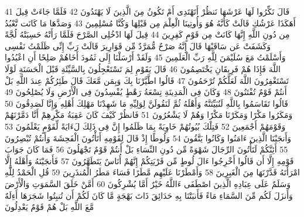 \documentclass[20pt,a4paper]{article}
\begin{document}
{\tiny\colorbox{cl_aya}{41}} قَالَ نَكِّرُوا لَهَا عَرْشَهَا نَنظُرْ أَتَهْتَدِى أَمْ تَكُونُ مِنَ الَّذِينَ لَا يَهْتَدُونَ
{\tiny\colorbox{cl_aya}{42}} فَلَمَّا جَاءَتْ قِيلَ أَهَكَذَا عَرْشُكِ قَالَتْ كَأَنَّهُ هُوَ وَأُوتِينَا الْعِلْمَ مِن قَبْلِهَا وَكُنَّا مُسْلِمِينَ
{\tiny\colorbox{cl_aya}{43}} وَصَدَّهَا مَا كَانَت تَّعْبُدُ مِن دُونِ اللَّهِ إِنَّهَا كَانَتْ مِن قَوْمٍ كَفِرِينَ
{\tiny\colorbox{cl_aya}{44}} قِيلَ لَهَا ادْخُلِى الصَّرْحَ فَلَمَّا رَأَتْهُ حَسِبَتْهُ لُجَّةً وَكَشَفَتْ عَن سَاقَيْهَا قَالَ إِنَّهُ صَرْحٌ مُّمَرَّدٌ مِّن قَوَارِيرَ قَالَتْ رَبِّ إِنِّى ظَلَمْتُ نَفْسِى وَأَسْلَمْتُ مَعَ سُلَيْمَنَ لِلَّهِ رَبِّ الْعَلَمِينَ
{\tiny\colorbox{cl_aya}{45}} وَلَقَدْ أَرْسَلْنَا إِلَى ثَمُودَ أَخَاهُمْ صَلِحًا أَنِ اعْبُدُوا اللَّهَ فَإِذَا هُمْ فَرِيقَانِ يَخْتَصِمُونَ
{\tiny\colorbox{cl_aya}{46}} قَالَ يَقَوْمِ لِمَ تَسْتَعْجِلُونَ بِالسَّيِّئَةِ قَبْلَ الْحَسَنَةِ لَوْلَا تَسْتَغْفِرُونَ اللَّهَ لَعَلَّكُمْ تُرْحَمُونَ
{\tiny\colorbox{cl_aya}{47}} قَالُوا اطَّيَّرْنَا بِكَ وَبِمَن مَّعَكَ قَالَ طَئِرُكُمْ عِندَ اللَّهِ بَلْ أَنتُمْ قَوْمٌ تُفْتَنُونَ
{\tiny\colorbox{cl_aya}{48}} وَكَانَ فِى الْمَدِينَةِ تِسْعَةُ رَهْطٍ يُفْسِدُونَ فِى الْأَرْضِ وَلَا يُصْلِحُونَ
{\tiny\colorbox{cl_aya}{49}} قَالُوا تَقَاسَمُوا بِاللَّهِ لَنُبَيِّتَنَّهُ وَأَهْلَهُ ثُمَّ لَنَقُولَنَّ لِوَلِيِّهِ مَا شَهِدْنَا مَهْلِكَ أَهْلِهِ وَإِنَّا لَصَدِقُونَ
{\tiny\colorbox{cl_aya}{50}} وَمَكَرُوا مَكْرًا وَمَكَرْنَا مَكْرًا وَهُمْ لَا يَشْعُرُونَ
{\tiny\colorbox{cl_aya}{51}} فَانظُرْ كَيْفَ كَانَ عَقِبَةُ مَكْرِهِمْ أَنَّا دَمَّرْنَهُمْ وَقَوْمَهُمْ أَجْمَعِينَ
{\tiny\colorbox{cl_aya}{52}} فَتِلْكَ بُيُوتُهُمْ خَاوِيَةً بِمَا ظَلَمُوا إِنَّ فِى ذَلِكَ لَءَايَةً لِّقَوْمٍ يَعْلَمُونَ
{\tiny\colorbox{cl_aya}{53}} وَأَنجَيْنَا الَّذِينَ ءَامَنُوا وَكَانُوا يَتَّقُونَ
{\tiny\colorbox{cl_aya}{54}} وَلُوطًا إِذْ قَالَ لِقَوْمِهِ أَتَأْتُونَ الْفَحِشَةَ وَأَنتُمْ تُبْصِرُونَ
{\tiny\colorbox{cl_aya}{55}} أَئِنَّكُمْ لَتَأْتُونَ الرِّجَالَ شَهْوَةً مِّن دُونِ النِّسَاءِ بَلْ أَنتُمْ قَوْمٌ تَجْهَلُونَ
{\tiny\colorbox{cl_aya}{56}} فَمَا كَانَ جَوَابَ قَوْمِهِ إِلَّا أَن قَالُوا أَخْرِجُوا ءَالَ لُوطٍ مِّن قَرْيَتِكُمْ إِنَّهُمْ أُنَاسٌ يَتَطَهَّرُونَ
{\tiny\colorbox{cl_aya}{57}} فَأَنجَيْنَهُ وَأَهْلَهُ إِلَّا امْرَأَتَهُ قَدَّرْنَهَا مِنَ الْغَبِرِينَ
{\tiny\colorbox{cl_aya}{58}} وَأَمْطَرْنَا عَلَيْهِم مَّطَرًا فَسَاءَ مَطَرُ الْمُنذَرِينَ
{\tiny\colorbox{cl_aya}{59}} قُلِ الْحَمْدُ لِلَّهِ وَسَلَمٌ عَلَى عِبَادِهِ الَّذِينَ اصْطَفَى ءَاللَّهُ خَيْرٌ أَمَّا يُشْرِكُونَ
{\tiny\colorbox{cl_aya}{60}} أَمَّنْ خَلَقَ السَّمَوَتِ وَالْأَرْضَ وَأَنزَلَ لَكُم مِّنَ السَّمَاءِ مَاءً فَأَنبَتْنَا بِهِ حَدَائِقَ ذَاتَ بَهْجَةٍ مَّا كَانَ لَكُمْ أَن تُنبِتُوا شَجَرَهَا أَءِلَهٌ مَّعَ اللَّهِ بَلْ هُمْ قَوْمٌ يَعْدِلُونَ
\end{document}
